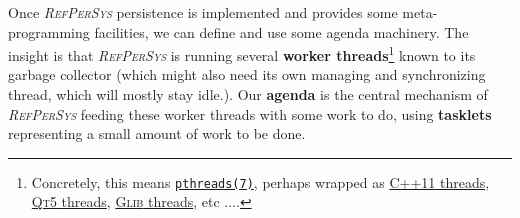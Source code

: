 \documentclass[11pt,a4paper,svgnames]{article}
\newcommand{\RefPerSys}{{\textit{\textsc{RefPerSys}}}}
\begin{document}
Once {\RefPerSys} persistence is implemented and provides some
meta-programming facilities, we can define and use some agenda
machinery. The insight is that {\RefPerSys} is running several
\cite{barney:2010:pthreads, butenhof:1997:programming} \textbf{worker
  threads}\footnote{Concretely, this means
\href{http://man7.org/linux/man-pages/man7/pthreads.7.html}{\texttt{pthreads(7)}},
perhaps wrapped as
\href{https://en.cppreference.com/w/cpp/thread}{\textsc{C++11}
  threads},
\href{https://doc.qt.io/qt-5/thread-basics.html}{\textsc{Qt5}
  threads},
\href{https://developer.gnome.org/glib/stable/glib-Threads.html}{\textsc{Glib}
  threads}, etc ....}  known to its garbage collector (which might
also need its own managing and synchronizing thread, which will mostly
stay idle.). Our \textbf{agenda}  is the central
mechanism of {\RefPerSys} feeding these worker threads with some work
to do, using \textbf{tasklets} representing a small amount of work to
be done.

\medskip
\end{document}
